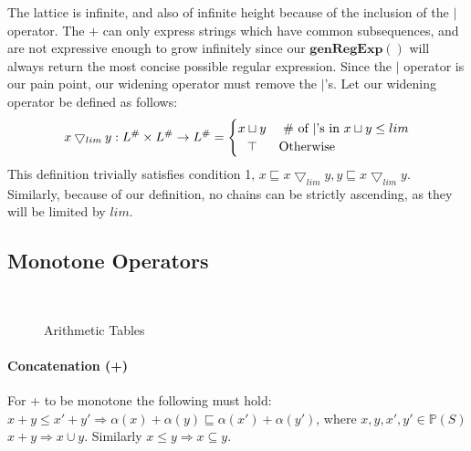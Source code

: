 \documentclass{article}
\newcommand{\powerset}[1]{\mathbb{P}(#1)}
\newcommand{\genRegExp}[1]{\mathbf{genRegExp}(#1)}
\begin{document}
The lattice is infinite, and also of infinite height because of the inclusion of the $|$ operator. The $+$ can only express strings which have common subsequences, and are not expressive enough to grow infinitely since our $\genRegExp{}$ will always return the most concise possible regular expression.  Since the $|$ operator is our pain point, our widening operator must remove the $|$'s.  Let our widening operator be defined as follows:
\[
 x \bigtriangledown_{lim} y : L^\# \times L^\# \rightarrow L^\# =
  \begin{cases} 
      \hfill x \sqcup y    \hfill & \text{ \# of $|$'s in $x \sqcup y \leq lim$} \\
      \hfill \top \hfill & \text{Otherwise} \\
  \end{cases}
\]
This definition trivially satisfies condition 1,  $x \sqsubseteq x \bigtriangledown_{lim} y, y \sqsubseteq x \bigtriangledown_{lim} y$.  Similarly, because of our definition, no chains can be strictly ascending, as they will be limited by $lim$.

\subsection{Monotone Operators}
\begin{figure*}
\centering
{}~~~~
\caption{Arithmetic Tables}
\label{fig:table}
\end{figure*}


\paragraph{Concatenation (+)}
For + to be monotone the following must hold: $x+y \leq x'+y' \Rightarrow  \alpha(x)+\alpha(y) \sqsubseteq \alpha(x')+\alpha(y')$, where $x,y,x',y' \in \powerset{S}$ $x+y \Rightarrow x \cup y$.  Similarly $x \leq y \Rightarrow x \subseteq y$.
\end{document}
